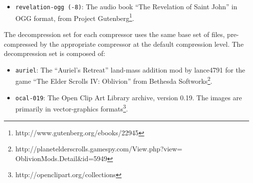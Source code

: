 {\begin{itemize}

\item {\tt revelation-ogg (-8)}: The audio book ``The Revelation of Saint John'' in OGG format, from Project Gutenberg\footnote{http://www.gutenberg.org/ebooks/22945}.


\end{itemize}

The decompression set for each compressor uses the same base set of files, pre-compressed by the appropriate compressor at the default compression level.  The decompression set is composed of:
\begin{itemize}
\item {\tt auriel}: The ``Auriel's Retreat'' land-mass addition mod by lance4791 for the game ``The Elder Scrolls IV: Oblivion'' from Bethesda Softworks\footnote{http://planetelderscrolls.gamespy.com/View.php?view=\\ \hspace*{150 pt}OblivionMods.Detail\&id=5949}.




\item {\tt ocal-019}: The Open Clip Art Library archive, version 0.19. The images are primarily in vector-graphics formats\footnote{http://openclipart.org/collections}.


\end{itemize}}
